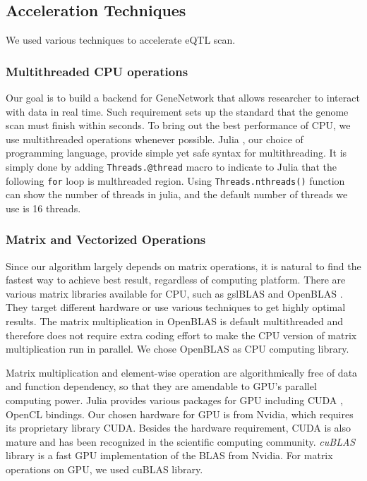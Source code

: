 \documentclass[9pt,twocolumn,twoside,lineno]{gsag3jnl}
\newcommand{\code}{\texttt}
\begin{document}
\subsection{Acceleration Techniques}
We used various techniques to accelerate eQTL scan. 
\subsubsection{Multithreaded CPU operations}
 Our goal is to build a backend for GeneNetwork that allows researcher to interact with data in real time. 
 Such requirement sets up the standard that the genome scan must finish within seconds.
 To bring out the best performance of CPU, we use multithreaded operations whenever possible. 
 Julia \citep{bezanson2017julia}, our choice of programming language, provide simple yet safe syntax for multithreading. 
 It is simply done by adding \code{Threads.@thread} macro to indicate to Julia that the following \code{for} loop is multhreaded region. 
 Using \code{Threads.nthreads()} function can show the number of threads in julia, and the default number of threads we use is 16 threads. 
  
 
\subsubsection{Matrix and Vectorized Operations}

Since our algorithm largely depends on matrix operations, it is natural to find the fastest way to achieve best result, regardless of computing platform. 
There are various matrix libraries available for CPU, such as gslBLAS and OpenBLAS \citep{wang2013augem}. 
They target different hardware or use various techniques to get highly optimal results. 
The matrix multiplication in OpenBLAS is default multithreaded and therefore does not require extra coding effort to make the CPU version of matrix multiplication run in parallel.
We chose OpenBLAS as CPU computing library.  

Matrix multiplication and element-wise operation are algorithmically free of data and function dependency, so that they are amendable to GPU's parallel computing power.
Julia provides various packages for GPU including CUDA \citep{Nickolls:2008:SPP:1365490.1365500}, OpenCL bindings. 
Our chosen hardware for GPU is from Nvidia, which requires its proprietary library CUDA. 
Besides the hardware requirement, CUDA is also mature and has been recognized in the scientific computing community. 
\textit{cuBLAS} \citep{cublas} library is a fast GPU implementation of the BLAS from Nvidia. 
For matrix operations on GPU, we used cuBLAS library. 
\end{document}
